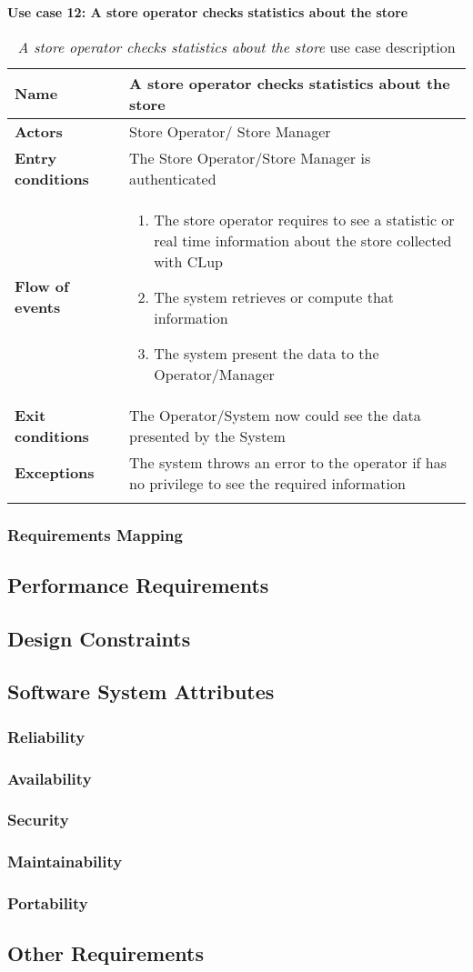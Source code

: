     \clearpage
    \textbf{Use case 12: A store operator checks statistics about the store}
    \smallskip
    \begin{longtable}{p{0.25\linewidth}p{0.75\linewidth}}
    \toprule
    \textbf{Name} & \textbf{A store operator checks statistics about the store} \\
    \midrule
    \textbf{Actors} & Store Operator/ Store Manager\\
    \midrule
    \textbf{Entry conditions} & The Store Operator/Store Manager is authenticated\\
    \midrule
    \textbf{Flow of events} & 
    \begin{enumerate}
        \item The store operator requires to see a statistic or real time information about the store collected with CLup
        \item The system retrieves or compute that information
        \item The system present the data to the Operator/Manager 
    \end{enumerate} \\
    \midrule
    \textbf{Exit conditions} & The Operator/System now could see the data presented by the System\\
    \midrule
    \textbf{Exceptions} & The system throws an error to the operator if has no privilege to see the required information \\
    \bottomrule
    \caption{\emph{A store operator checks statistics about the store} use case description}
    \end{longtable}


\subsubsection{Requirements Mapping}
\subsection{Performance Requirements}
\subsection{Design Constraints}
\subsection{Software System Attributes}
\subsubsection{Reliability}
\subsubsection{Availability}
\subsubsection{Security}
\subsubsection{Maintainability}
\subsubsection{Portability}
\subsection{Other Requirements}